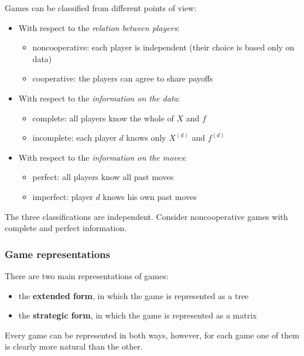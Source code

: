 Games can be classified from different points of view: 
\begin{itemize}
	\item With respect to the \textit{relation between players}:
	\begin{itemize}
		\item noncooperative: each player is independent (their choice is based only on data)
		
		\item cooperative: the players can agree to share payoffs
	\end{itemize}
	
	\item With respect to the \textit{information on the data}:
	\begin{itemize}
		\item complete: all players know the whole of $X$ and $f$ 
		
		\item incomplete: each player $d$ knows only $X^{(d)}$ and $f^{(d)}$
	\end{itemize}
	
	\item With respect to the \textit{information on the moves}: 
	\begin{itemize}
		\item perfect: all players know all past moves
		
		\item imperfect: player $d$ knows his own past moves
	\end{itemize}
\end{itemize}
The three classifications are independent. Consider noncooperative games with complete and perfect information.

\subsubsection{Game representations}

There are two main representations of games: 
\begin{itemize}
	\item the \textbf{extended form}, in which the game is represented as a tree 
	
	\item the \textbf{strategic form}, in which the game is represented as a matrix
\end{itemize}

Every game can be represented in both ways, however, for each game one of them is clearly more natural than the other.

